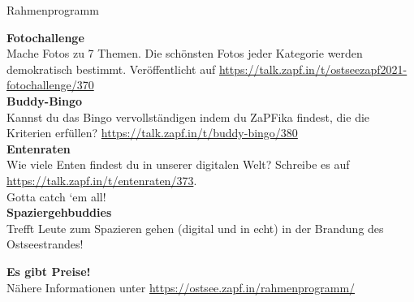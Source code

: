 \documentclass[compress, aspectratio=169]{beamer}
\begin{document}
\begin{frame}{Rahmenprogramm}
    \begin{footnotesize}
    \textbf{Fotochallenge}\\
    Mache Fotos zu 7 Themen. Die schönsten Fotos jeder Kategorie werden demokratisch bestimmt.
    Veröffentlicht auf \url{https://talk.zapf.in/t/ostseezapf2021-fotochallenge/370}\\
    \textbf{Buddy-Bingo}\\ 
    Kannst du das Bingo vervollständigen indem du ZaPFika findest, die die Kriterien erfüllen? \url{https://talk.zapf.in/t/buddy-bingo/380}\\
    \textbf{Entenraten}\\
    Wie viele Enten findest du in unserer digitalen Welt?
    Schreibe es auf \url{https://talk.zapf.in/t/entenraten/373}.\\
    Gotta catch ‘em all!\\
    \textbf{Spaziergehbuddies}\\
    Trefft Leute zum Spazieren gehen (digital und in echt) in der Brandung des Ostseestrandes!\\
    \begin{center}
        \textbf{Es gibt Preise!}\\
        Nähere Informationen unter \url{https://ostsee.zapf.in/rahmenprogramm/}
    \end{center}
    \end{footnotesize}
    
\end{frame}
	
	
	
\end{document}

